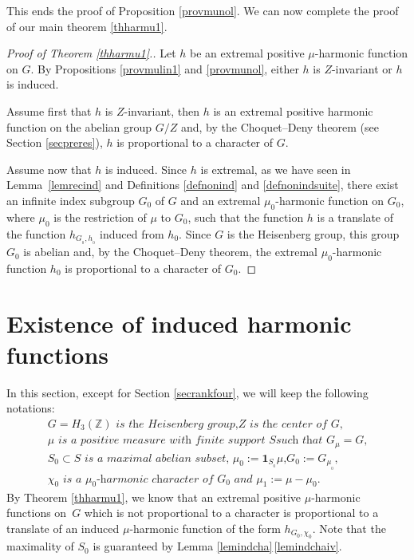 \documentclass[JEP,XML,SOM,Unicode]{cedram}
\theoremstyle{definition}
\newcommand{\m}[1]{\mathbb{ #1}}
\begin{document}
This ends the proof of Proposition \ref{provmunol}. We can now complete the proof of our main theorem \ref{thharmu1}.

\begin{proof}[Proof of Theorem \ref{thharmu1}.]
Let $h$ be an extremal positive $\mu$-harmonic function on $G$.
By Propositions \ref{provmulin1} and \ref{provmunol}, either $h$ is $Z$-invariant or
$h$ is induced.

Assume first that $h$ is $Z$-invariant, then $h$ is an extremal positive harmonic function
on the abelian group $G/Z$ and, by the Choquet--Deny theorem (see Section \ref{secpreres}),
$h$ is proportional to a character of $G$.

Assume now that $h$ is induced. Since $h$ is extremal,
as we have seen in Lemma~\ref{lemrecind} and Definitions \ref{defnonind} and \ref{defnonindsuite},
there exist an infinite index subgroup
$G_0$ of $G$ and an extremal $\mu_0$-harmonic function on $G_0$,
where $\mu_0$ is the restriction of $\mu$ to $G_0$,
such that the function $h$ is a translate of the function $h_{G_{_0},h_{_0}}$ induced from $h_0$.
Since $G$ is the Heisenberg group, this group $G_0$ is abelian
and, by the Choquet--Deny theorem, the extremal $\mu_0$-harmonic function $h_0$ is proportional to a character of $G_0$.
\end{proof}

\section{Existence of induced harmonic functions}
\label{secexiind}

In this section, except for Section \ref{secrankfour}, we will keep the following notations:
\begin{equation}
\label{eqnnotbul}
\begin{array}{l}
\textit{$G=H_3(\m Z)$ is the Heisenberg group,
$Z$ is the center of $G$,}\\
\textit{$\mu$ is a positive measure with finite support $S$
such that $G_\mu=G$,}\\
\textit{$S_0\subset S$ is a maximal abelian subset, $\mu_0:=\mathbf{1}_{S_{_0}}\mu$,
$G_0:=G_{\mu_{_0}}$,}\\
\textit{$\chi_0$ is a $\mu_0$-harmonic character of $G_0$ and $\mu_1:=\mu-\mu_0$.}
\end{array}
\end{equation}
By Theorem \ref{thharmu1}, we know that an extremal positive $\mu$-harmonic functions
on~$G$ which is not proportional to a character is proportional to
a translate of an induced $\mu$\nobreakdash-harmonic function of the form $h_{G_0,\chi_0}$.
Note that the maximality of $S_0$ is guaranteed by Lemma \ref{lemindcha}\,\eqref{lemindchaiv}.
\end{document}
